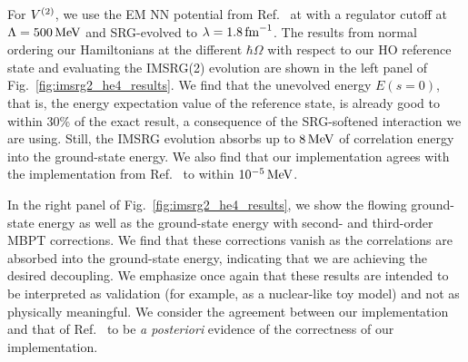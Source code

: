For ${V}^{(2)}$, we use the EM NN potential from Ref.~\cite{Ente03n3lonn} at \nthreelo{}
with a regulator cutoff at $\Lambda=500\, \text{MeV}$ and SRG-evolved to $\lambda=1.8\, \text{fm}^{-1}$.
The results from normal ordering our Hamiltonians at the different $\hbar \Omega$
with respect to our HO reference state
and evaluating the IMSRG(2) evolution are shown
in the left panel of Fig.~\ref{fig:imsrg2_he4_results}.
We find that the unevolved energy $E(s=0)$,
that is, the energy expectation value of the reference state,
is already good to within 30\% of the exact result,
a consequence of the SRG-softened interaction we are using.
Still, the IMSRG evolution absorbs up to $8\, \text{MeV}$ of correlation energy into the ground-state energy.
We also find that our implementation agrees with the implementation from Ref.~\cite{Stro15imsrgcpp}
to within $10^{-5}\, \text{MeV}$.

In the right panel of Fig.~\ref{fig:imsrg2_he4_results},
we show the flowing ground-state energy
as well as the ground-state energy with second- and third-order MBPT corrections.
We find that these corrections vanish as the correlations are absorbed into the ground-state energy,
indicating that we are achieving the desired decoupling.
We emphasize once again that these results are intended to be interpreted as validation
(for example, as a nuclear-like toy model)
and not as physically meaningful.
We consider the agreement between our implementation and that of Ref.~\cite{Stro15imsrgcpp}
to be \textit{a posteriori} evidence of the correctness of our implementation.
